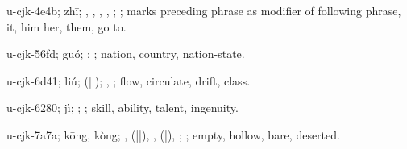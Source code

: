 \begin{multicols}{2}
{\cjkgGlue{}u-cjk-4e4b; zhī; \cjkgGlue{}, \cjkgGlue{}, \cjkgGlue{}, \cjkgGlue{}, \cjkgGlue{}; \cjkgGlue{}; marks preceding phrase as modifier of following phrase, it, him her, them, go to.

\cjkgGlue{}u-cjk-56fd; guó; \cjkgGlue{}; \cjkgGlue{}; nation, country, nation-state.

\cjkgGlue{}u-cjk-6d41; liú; \cjkgGlue{}\cjkgGlue{}(\cjkgGlue{}|\cjkgGlue{}|\cjkgGlue{}); \cjkgGlue{}, \cjkgGlue{}; flow, circulate, drift, class.

\cjkgGlue{}u-cjk-6280; jì; \cjkgGlue{}; \cjkgGlue{}; skill, ability, talent, ingenuity.

\cjkgGlue{}u-cjk-7a7a; kōng, kòng; \cjkgGlue{}, \cjkgGlue{}\cjkgGlue{}(\cjkgGlue{}|\cjkgGlue{}|\cjkgGlue{}), \cjkgGlue{}, \cjkgGlue{}\cjkgGlue{}(\cjkgGlue{}|\cjkgGlue{}), \cjkgGlue{}\cjkgGlue{}\cjkgGlue{}; \cjkgGlue{}; empty, hollow, bare, deserted.

}
\end{multicols}
